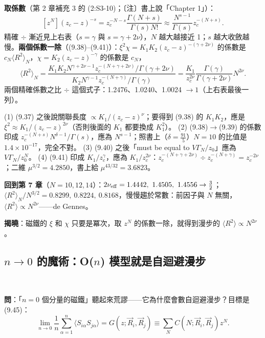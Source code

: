 \textbf{取係數}（第 2 章補充 3 的 (2:S3-10)；〔注〕書上說「Chapter 1」）：
\[[z^N](z_c-z)^{-s}=z_c^{-N-s}\frac{\Gamma(N+s)}{\Gamma(s)N!}\approx\frac{N^{s-1}}{\Gamma(s)}z_c^{-(N+s)} .\]
精確 $\div$ 漸近見上右表（$s=\gamma$ 與 $s=\gamma+2\nu$），$N$ 越大越接近 1；$s$ 越大收斂越慢。\textbf{兩個係數一除}（(9.38)--(9.41)）：$\xi^2\chi=K_1K_2(z_c-z)^{-(\gamma+2\nu)}$ 的係數是 $c_N\langle R^2\rangle_N$，$\chi=K_2(z_c-z)^{-\gamma}$ 的係數是 $c_N$，
\[\langle R^2\rangle_N=\frac{K_1K_2N^{\gamma+2\nu-1}z_c^{-(N+\gamma+2\nu)}/\Gamma(\gamma+2\nu)}{K_2N^{\gamma-1}z_c^{-(N+\gamma)}/\Gamma(\gamma)}=\frac{K_1}{z_c^{2\nu}}\frac{\Gamma(\gamma)}{\Gamma(\gamma+2\nu)}N^{2\nu}.\tag{9.41}\]
兩個精確係數之比 $\div$ 這個式子：1.2476、1.0240、1.0024 $\to1$（上右表最後一列）。
\begin{errbox}[p.~218--219，(9.37)--(9.41)]
(1) (9.37) 之後說關聯長度 $\propto K_1/(z_c-z)^\nu$；要得到 (9.38) 的 $K_1K_2$，應是 $\xi^2\approx K_1/(z_c-z)^{2\nu}$（否則後面的 $K_1$ 都要換成 $K_1^2$）。
(2) (9.38)$\to$(9.39) 的係數印成 $z_c^{-(N+s)}N^{\delta-1}/\Gamma(s)$，應為 $N^{s-1}$；照書上（$\delta=\frac{91}5$）$N=10$ 的比值是 $1.4\times10^{-17}$，完全不對。
(3) (9.40) 之後「must be equal to $V\Gamma_N/z_0$」應為 $V\Gamma_N/z_0^N$。
(4) (9.41) 印成 $K_1/z_c^{\gamma}$，應為 $K_1/z_c^{2\nu}$：$z_c^{-(N+\gamma+2\nu)}\div z_c^{-(N+\gamma)}=z_c^{-2\nu}$；二維 $\mu^{3/2}=4.2850$，書上給 $\mu^{43/32}=3.6823$。
\end{errbox}
\textbf{回到第 7 章}（$N=10,12,14$）：$2\nu_{\rm eff}=1.4442,\ 1.4505,\ 1.4556\to\frac32$；$\langle R^2\rangle_N/N^{3/2}=0.8299,\ 0.8224,\ 0.8168$，慢慢趨於常數：前因子與 $N$ 無關，$\langle R^2\rangle\propto N^{2\nu}$——de Gennes。

\textbf{揭曉}：磁鐵的 $\xi$ 和 $\chi$ 只要是冪次，取 $z^N$ 的係數一除，就得到漫步的 $\langle R^2\rangle\propto N^{2\nu}$。

\subsection{\texorpdfstring{$n\to0$}{n→0} 的魔術：O(\texorpdfstring{$n$}{n}) 模型就是自迴避漫步}
\leavevmode{}\ \par\nopagebreak

\textbf{問}：「$n=0$ 個分量的磁鐵」聽起來荒謬——它為什麼會數自迴避漫步？目標是 (9.45)：
\[\lim_{n\to0}\frac1n\sum_{\alpha=1}^n\langle S_{i\alpha}S_{j\alpha}\rangle=G(z;\vec R_i,\vec R_j)\equiv\sum_NC(N;\vec R_i,\vec R_j)z^N .\tag{9.45}\]

